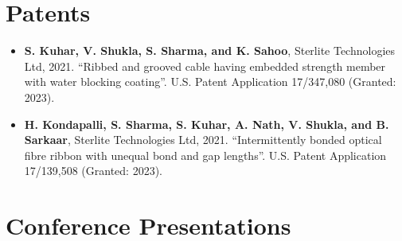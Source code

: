 \documentclass[11pt]{article}
\begin{document}
\vspace{6mm}

\section*{Patents}

\begin{itemize}[leftmargin=*,itemsep=1pt]
    \item \textbf{S. Kuhar, V. Shukla, S. Sharma, and K. Sahoo}, Sterlite Technologies Ltd, 2021. “Ribbed and grooved cable having embedded strength member with water blocking coating”. U.S. Patent Application 17/347,080 (Granted: 2023).
    \item \textbf{H. Kondapalli, S. Sharma, S. Kuhar, A. Nath, V. Shukla, and B. Sarkaar}, Sterlite Technologies Ltd, 2021. “Intermittently bonded optical fibre ribbon with unequal bond and gap lengths”. U.S. Patent Application 17/139,508 (Granted: 2023).
\end{itemize}

\vspace{6mm}

\section*{Conference Presentations}
\end{document}
